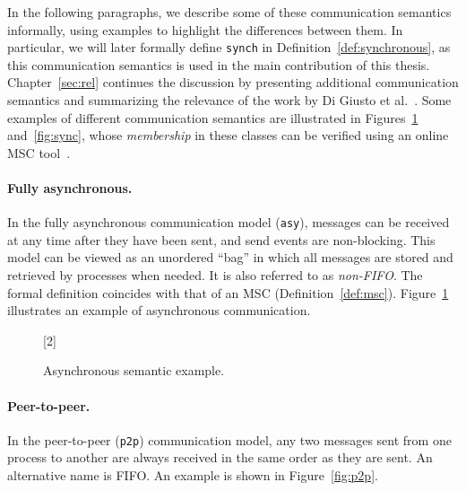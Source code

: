 In the following paragraphs, we describe some of these communication
semantics informally, using examples to highlight the differences between
them. In particular, we will later formally define \verb|synch| in
Definition~\ref{def:synchronous}, as this communication semantics is used
in the main contribution of this thesis. Chapter~\ref{sec:rel} continues
the discussion by presenting additional communication semantics and
summarizing the relevance of the work by Di Giusto et
al.~\cite{di2023partial}. Some examples of different communication semantics
are illustrated in Figures~\ref{fig:asy} and~\ref{fig:sync}, whose
\emph{membership} in these classes can be verified using an online MSC
tool~\cite{MSCTool}.

\paragraph{Fully asynchronous.}
In the fully asynchronous communication model (\verb|asy|), messages can be 
received at any time after they have been sent, and send events are 
non-blocking. This model can be viewed as an unordered ``bag'' in which 
all messages are stored and retrieved by processes when needed. It is also 
referred to as \emph{non-FIFO}. The formal definition coincides with that of 
an MSC (Definition~\ref{def:msc}). Figure~\ref{fig:asy} illustrates an example of asynchronous 
communication.

\begin{figure}[!ht]
    \centering
      \begin{msc}[draw frame=none, draw head=none, msc keyword=, 
                  head height=0px, label distance=0.5ex, 
                  foot height=0px, foot distance=0px]{}

          [2]
          \nextlevel
      \end{msc}
  \caption{Asynchronous semantic example.}
  \label{fig:asy}
\end{figure}

\paragraph{Peer-to-peer.} 
In the peer-to-peer (\verb|p2p|) communication model, any two messages sent from one 
process to another are always received in the same order as they are sent.
An alternative name is FIFO. An example is shown in Figure~\ref{fig:p2p}.

